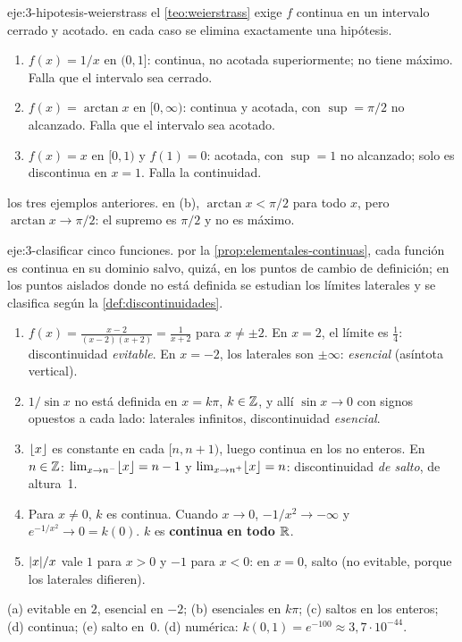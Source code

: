 \begin{solucion}{eje:3-hipotesis-weierstrass}
\datos el \cref{teo:weierstrass} exige $f$ continua en un intervalo cerrado y acotado.
\planteamiento en cada caso se elimina exactamente una hipótesis.
\pasos
\begin{enumerate}[label=(\alph*)]
  \item $f(x)=1/x$ en $(0,1]$: continua, no acotada superiormente; no tiene máximo. Falla que el intervalo sea cerrado.
  \item $f(x)=\arctan x$ en $[0,\infty)$: continua y acotada, con $\sup=\pi/2$ no alcanzado. Falla que el intervalo sea acotado.
  \item $f(x)=x$ en $[0,1)$ y $f(1)=0$: acotada, con $\sup=1$ no alcanzado; solo es discontinua en $x=1$. Falla la continuidad.
\end{enumerate}
\resultado los tres ejemplos anteriores.
\comprobacion en (b), $\arctan x<\pi/2$ para todo $x$, pero $\arctan x\to\pi/2$: el supremo es $\pi/2$ y no es máximo.
\end{solucion}

\begin{solucion}{eje:3-clasificar}
\datos cinco funciones.
\planteamiento por la \cref{prop:elementales-continuas}, cada función es continua en su dominio salvo, quizá, en los puntos de cambio de definición; en los puntos aislados donde no está definida se estudian los límites laterales y se clasifica según la \cref{def:discontinuidades}.
\pasos
\begin{enumerate}[label=(\alph*)]
  \item $f(x)=\frac{x-2}{(x-2)(x+2)}=\frac{1}{x+2}$ para $x\ne\pm2$. En $x=2$, el límite es $\frac14$: discontinuidad \emph{evitable}. En $x=-2$, los laterales son $\pm\infty$: \emph{esencial} (asíntota vertical).
  \item $1/\sin x$ no está definida en $x=k\pi$, $k\in\mathbb{Z}$, y allí $\sin x\to0$ con signos opuestos a cada lado: laterales infinitos, discontinuidad \emph{esencial}.
  \item $\lfloor x\rfloor$ es constante en cada $[n,n+1)$, luego continua en los no enteros. En $n\in\mathbb{Z}$: $\lim_{x\to n^{-}}\lfloor x\rfloor=n-1$ y $\lim_{x\to n^{+}}\lfloor x\rfloor=n$: discontinuidad \emph{de salto}, de altura~1.
  \item Para $x\ne0$, $k$ es continua. Cuando $x\to0$, $-1/x^{2}\to-\infty$ y $e^{-1/x^{2}}\to0=k(0)$. $k$ es \textbf{continua en todo $\mathbb{R}$}.
  \item $\lvert x\rvert/x$ vale $1$ para $x>0$ y $-1$ para $x<0$: en $x=0$, salto (no evitable, porque los laterales difieren).
\end{enumerate}
\resultado (a) evitable en $2$, esencial en $-2$; (b) esenciales en $k\pi$; (c) saltos en los enteros; (d) continua; (e) salto en~0.
\comprobacion (d) numérica: $k(0{,}1)=e^{-100}\approx3{,}7\cdot10^{-44}$.
\end{solucion}

